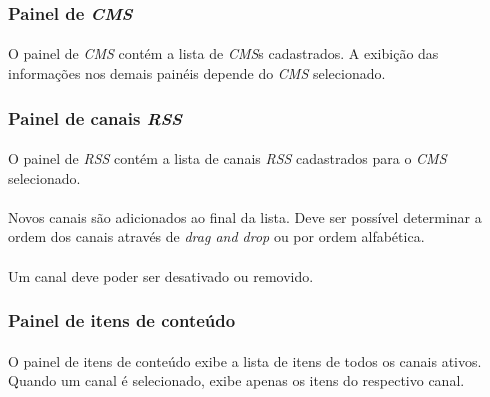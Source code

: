 \documentclass[a4paper,12pt]{article}
\def\blog{\emph{CMS}}
\def\feeds{\emph{RSS}}
\def\dragndrop{\emph{drag and drop}}
\begin{document}
\subsubsection{Painel de \blog{}}

\paragraph{}
O painel de \blog{} contém a lista de \blog{}s cadastrados. A exibição das informações nos demais painéis depende do \blog{} selecionado.

\subsubsection{Painel de canais \feeds{}}

\paragraph{}
O painel de \feeds{} contém a lista de canais \feeds{} cadastrados para o \blog{}
selecionado.


\paragraph{}
Novos canais são adicionados ao final da lista. Deve ser possível determinar a
ordem dos canais através de \dragndrop{} ou por ordem alfabética.

\paragraph{}
Um canal deve poder ser desativado ou removido. 

\subsubsection{Painel de itens de conteúdo}

\paragraph{}
O painel de itens de conteúdo exibe a lista de itens de todos os canais ativos.
Quando um canal é selecionado, exibe apenas os itens do respectivo canal.
\end{document}
